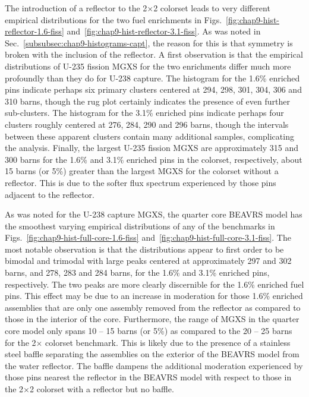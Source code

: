 The introduction of a reflector to the 2$\times$2 colorset leads to very different empirical distributions for the two fuel enrichments in Figs.~\ref{fig:chap9-hist-reflector-1.6-fiss} and~\ref{fig:chap9-hist-reflector-3.1-fiss}. As was noted in Sec.~\ref{subsubsec:chap9-histograms-capt}, the reason for this is that symmetry is broken with the inclusion of the reflector. A first observation is that the empirical distributions of U-235 fission \ac{MGXS} for the two enrichments differ much more profoundly than they do for U-238 capture. The histogram for the 1.6\% enriched pins indicate perhaps six primary clusters centered at 294, 298, 301, 304, 306 and 310 barns, though the rug plot certainly indicates the presence of even further sub-clusters. The histogram for the 3.1\% enriched pins indicate perhaps four clusters roughly centered at 276, 284, 290 and 296 barns, though the intervals between these apparent clusters contain many additional samples, complicating the analysis. Finally, the largest U-235 fission \ac{MGXS} are approximately 315 and 300 barns for the 1.6\% and 3.1\% enriched pins in the colorset, respectively, about 15 barns (or 5\%) greater than the largest \ac{MGXS} for the colorset without a reflector. This is due to the softer flux spectrum experienced by those pins adjacent to the reflector.

As was noted for the U-238 capture \ac{MGXS}, the quarter core \ac{BEAVRS} model has the smoothest varying empirical distributions of any of the benchmarks in Figs.~\ref{fig:chap9-hist-full-core-1.6-fiss} and~\ref{fig:chap9-hist-full-core-3.1-fiss}. The most notable observation is that the distributions appear to first order to be bimodal and trimodal with large peaks centered at approximately 297 and 302 barns, and 278, 283 and 284 barns, for the 1.6\% and 3.1\% enriched pins, respectively. The two peaks are more clearly discernible for the 1.6\% enriched fuel pins. This effect may be due to an increase in moderation for those 1.6\% enriched assemblies that are only one assembly removed from the reflector as compared to those in the interior of the core. Furthermore, the range of \ac{MGXS} in the quarter core model only spans 10 -- 15 barns (or 5\%) as compared to the 20 -- 25 barns for the 2$\times$ colorset benchmark. This is likely due to the presence of a stainless steel baffle separating the assemblies on the exterior of the \ac{BEAVRS} model from the water reflector. The baffle dampens the additional moderation experienced by those pins nearest the reflector in the \ac{BEAVRS} model with respect to those in the 2$\times$2 colorset with a reflector but no baffle.

